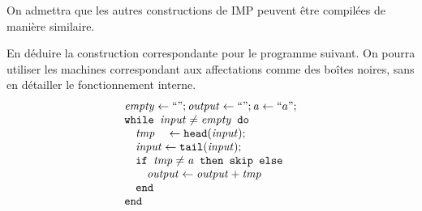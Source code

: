 \begin{exercice}
\begin{corrections}
  \end{corrections}
  
  On admettra que les autres constructions de IMP peuvent être compilées de manière similaire.
  \begin{questions}
  \item En déduire la construction correspondante pour le programme suivant.
    On pourra utiliser les machines correspondant aux affectations comme des boîtes noires, sans en détailler le fonctionnement interne.
    $$
    \begin{array}{l}
      \mathit{empty}\leftarrow ``" ; \mathit{output}\leftarrow ``"; \mathit{a}\leftarrow ``a" ; \\
      \texttt{while }\mathit{input} \neq \mathit{empty} \texttt{ do } \\
      \quad  \mathit{tmp} ~~~\leftarrow \texttt{head}(\mathit{input}) ;\\
      \quad  \mathit{input} \leftarrow \texttt{tail}(\mathit{input}) ; \\
      \quad  \texttt{if }\mathit{tmp} \neq \mathit{a} \texttt{ then skip else } \\
      \quad\quad  \mathit{output} \leftarrow \mathit{output} + \mathit{tmp} \\
      \quad  \texttt{end }\\
      \texttt{end}
    \end{array}
    $$
  \end{questions}
  \begin{corrections}
\end{corrections}
\end{exercice}
